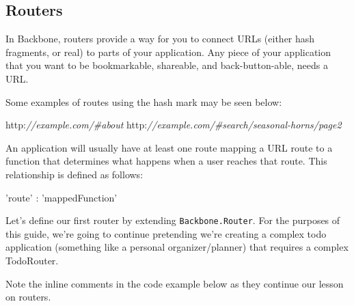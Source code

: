 \documentclass[9pt]{book}
\newenvironment{Shaded}{}{}
\newcommand{\StringTok}[1]{\textcolor[rgb]{0.25,0.44,0.63}{{#1}}}
\newcommand{\CommentTok}[1]{\textcolor[rgb]{0.38,0.63,0.69}{\textit{{#1}}}}
\newcommand{\NormalTok}[1]{{#1}}
\begin{document}
\subsection{Routers}\label{routers}

In Backbone, routers provide a way for you to connect URLs (either hash
fragments, or real) to parts of your application. Any piece of your
application that you want to be bookmarkable, shareable, and
back-button-able, needs a URL.

Some examples of routes using the hash mark may be seen below:

\begin{Shaded}
\begin{Highlighting}[]
\NormalTok{http:}\CommentTok{//example.com/#about}
\NormalTok{http:}\CommentTok{//example.com/#search/seasonal-horns/page2}
\end{Highlighting}
\end{Shaded}

An application will usually have at least one route mapping a URL route
to a function that determines what happens when a user reaches that
route. This relationship is defined as follows:

\begin{Shaded}
\begin{Highlighting}[]
\StringTok{'route'} \NormalTok{: }\StringTok{'mappedFunction'}
\end{Highlighting}
\end{Shaded}

Let's define our first router by extending \texttt{Backbone.Router}. For
the purposes of this guide, we're going to continue pretending we're
creating a complex todo application (something like a personal
organizer/planner) that requires a complex TodoRouter.

Note the inline comments in the code example below as they continue our
lesson on routers.
\end{document}
